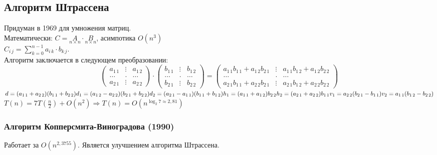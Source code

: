 \documentclass[12pt, a4paper]{article}
\begin{document}
    \subsection{Алгоритм Штрассена}
    Придуман в 1969 для умножения матриц.\\
    Математически: $C = \underset{n\times n} A \cdot \underset{n\times n}{B}$, асимпотика $O(n^3)$\\
    $C_{i\, j} = \displaystyle \sum_{k = 0}^{n - 1} a_{i\, k}\cdot b_{k\, j}$.\\
    Алгоритм заключается в следующем преобразовании:
    \[\begin{pmatrix}
        a_{1\, 1} & \vdots & a_{1\, 2}\\
        \dots & . & \dots \\
        a_{2\, 1} & \vdots & a_{2\, 2}
    \end{pmatrix}\cdot \begin{pmatrix}
        b_{1\, 1} & \vdots & b_{1\, 2}\\
        \dots & . & \dots \\
        b_{2\, 1} & \vdots & b_{2\, 2}
    \end{pmatrix} = \begin{pmatrix}
        a_{1\, 1}b_{1\, 1} + a_{1\, 2}b_{2\, 1} & \vdots & a_{1\, 1}b_{1\, 2} + a_{1\, 2}b_{2\, 2}\\
        \dots & . & \dots \\
        a_{2\, 1}b_{1\, 1} + a_{2\, 2}b_{2\, 1} & \vdots & a_{2\, 1}b_{1\, 2} + a_{2\, 2}b_{2\,2}
    \end{pmatrix}\]
    $d = (a_{1\, 1} + a_{2\, 2})(b_{1\, 1} + b_{2\, 2})\\
    d_1 = (a_{1\, 2} - a_{2\, 2})(b_{2\, 1} + b_{2\, 2})\\
    d_2 = (a_{2\, 1} - a_{1\, 1})(b_{1\, 1} + b_{1\, 2})\\
    h_1 = (a_{1\, 1} + a_{1\, 2})b_{2\, 2}\\
    h_2 = (a_{2\, 1} + a_{2\, 2})b_{1\, 1}\\
    v_1 = a_{2\, 2}(b_{2\, 1} - b_{1\, 1})\\
    v_2 = a_{1\, 1}(b_{1\, 2} - b_{2\, 2})$\\
    $T(n) = 7T\left(\frac{n}{2}\right) + O(n^2)\Rightarrow T(n) = O(n^{\log_2 7\approx 2,81})$\\
    \subsubsection*{Алгоритм Копперсмита-Виноградова (1990)}
    Работает за $O(n^{2,3755})$. Является улучшением алгоритма Штрассена.\\
\end{document}
